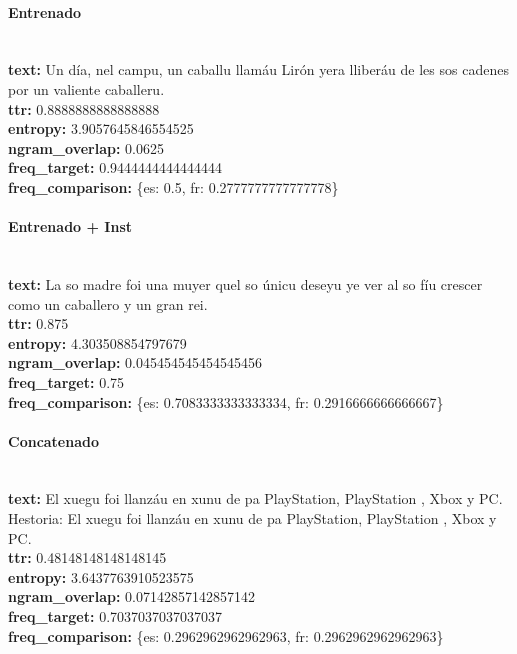 \paragraph{Entrenado}~\\
\textbf{text:} Un día, nel campu, un caballu llamáu Lirón yera lliberáu de les sos cadenes por un valiente caballeru.\\
\textbf{ttr:} 0.8888888888888888\\
\textbf{entropy:} 3.9057645846554525\\
\textbf{ngram\_overlap:} 0.0625\\
\textbf{freq\_target:} 0.9444444444444444\\
\textbf{freq\_comparison:} \{\textquotesingle{}es\textquotesingle{}: 0.5, \textquotesingle{}fr\textquotesingle{}: 0.2777777777777778\}\\

\paragraph{Entrenado + Inst}~\\
\textbf{text:} La so madre foi una muyer que\textquotesingle{}l so únicu deseyu ye ver al so fíu crescer como un caballero y un gran rei.\\
\textbf{ttr:} 0.875\\
\textbf{entropy:} 4.303508854797679\\
\textbf{ngram\_overlap:} 0.045454545454545456\\
\textbf{freq\_target:} 0.75\\
\textbf{freq\_comparison:} \{\textquotesingle{}es\textquotesingle{}: 0.7083333333333334, \textquotesingle{}fr\textquotesingle{}: 0.2916666666666667\}\\

\paragraph{Concatenado}~\\
\textbf{text:} El xuegu foi llanzáu en xunu de pa PlayStation, PlayStation , Xbox y PC. Hestoria: El xuegu foi llanzáu en xunu de pa PlayStation, PlayStation , Xbox y PC.\\
\textbf{ttr:} 0.48148148148148145\\
\textbf{entropy:} 3.6437763910523575\\
\textbf{ngram\_overlap:} 0.07142857142857142\\
\textbf{freq\_target:} 0.7037037037037037\\
\textbf{freq\_comparison:} \{\textquotesingle{}es\textquotesingle{}: 0.2962962962962963, \textquotesingle{}fr\textquotesingle{}: 0.2962962962962963\}\\


